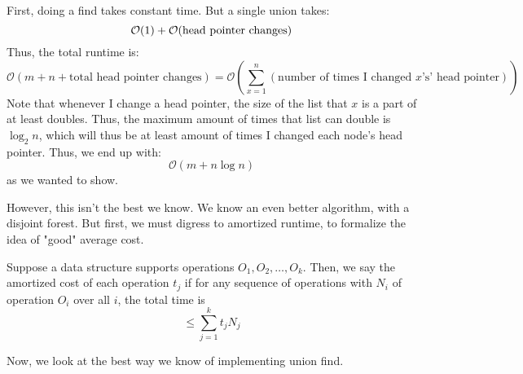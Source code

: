 \begin{proof*}
    First, doing a find takes constant time. But a single union takes:
    \[ \operatorname{\mathcal{O}}(1) + \operatorname{\mathcal{O}}(\text{head pointer changes}) \]
    Thus, the total runtime is:
    \[ \mathcal{O}(m + n + \text{total head pointer changes}) = \mathcal{O}(\sum_{x = 1}^n (\text{number of times I changed $x$'s' head pointer})) \]
    Note that whenever I change a head pointer, the size of the list that $x$ is a part of at least doubles.
    Thus, the maximum amount of times that list can double is $\log_2 n$, which will thus be at least amount of times I changed each node's head pointer.
    Thus, we end up with:
    \[ \mathcal{O}(m + n\log n) \]
    as we wanted to show.
\end{proof*}

However, this isn't the best we know. We know an even better algorithm, with
a disjoint forest. But first, we must digress to amortized runtime, to formalize
the idea of "good" average cost.

\begin{definition}
    Suppose a data structure supports operations $O_1, O_2, \dots, O_k$.
    Then, we say the amortized cost of each operation $t_j$ if for
    any sequence of operations with $N_i$ of operation $O_i$ over all $i$, the total time
    is
    \[ \leq \sum_{j = 1}^k t_j N_j \]
\end{definition}

Now, we look at the best way we know of implementing union find.

